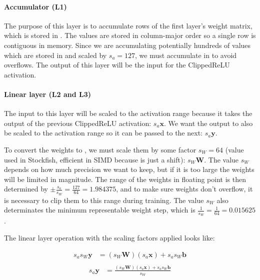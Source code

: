 
\paragraph[short]{Accumulator (L1)}



The purpose of this layer is to accumulate rows of the first layer's weight matrix, which is stored in . The values are stored in column-major order so a single row is contiguous in memory. Since we are accumulating potentially hundreds of values which are stored in  and scaled by $s_a=127$, we must accumulate in  to avoid overflows. The output of this layer will be the input for the ClippedReLU activation.

\paragraph[short]{Linear layer (L2 and L3)} The input to this layer will be scaled to the activation range because it takes the output of the previous ClippedReLU activation: $s_a \bm{x}$. We want the output to also be scaled to the activation range so it can be passed to the next: $s_a \bm{y}$.

To convert the weights to , we must scale them by some factor $s_W=64$ (value used in Stockfish, efficient in SIMD because is just a shift): $s_W \bm{W}$. The value $s_W$ depends on how much precision we want to keep, but if it is too large the weights will be limited in magnitude. The range of the weights in floating point is then determined by $\pm \frac{s_a}{s_W}=\frac{127}{64}=1.984375$, and to make sure weights don't overflow, it is necessary to clip them to this range during training. The value $s_W$ also determinates the minimum representable weight step, which is $\frac{1}{s_W}=\frac{1}{64}=0.015625$.

The linear layer operation with the scaling factors applied looks like:

\begin{equation}
\begin{aligned}
s_a s_W \bm{y} &= (s_W \bm{W}) (s_a \bm{x}) + s_a s_W \bm{b} \\
\end{aligned}
\end{equation}
\begin{equation}
\begin{aligned}
s_a \bm{y} &= \frac{(s_W \bm{W}) (s_a \bm{x}) + s_a s_W \bm{b}}{s_W} \\
\end{aligned}
\end{equation}

